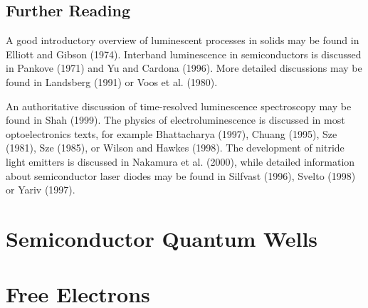 \documentclass[12pt]{book}
\begin{document}
\section*{Further Reading}
A good introductory overview of luminescent processes in solids may be found in Elliott and Gibson (1974). Interband luminescence in semiconductors is discussed in Pankove (1971) and Yu and Cardona (1996). More detailed discussions may be found in Landsberg (1991) or Voos et al. (1980).

An authoritative discussion of time-resolved luminescence spectroscopy may be found in Shah (1999).
The physics of electroluminescence is discussed in most optoelectronics texts, for example Bhattacharya (1997), Chuang (1995), Sze (1981), Sze (1985), or Wilson and Hawkes (1998). The development of nitride light emitters is discussed in Nakamura et al. (2000), while detailed information about semiconductor laser diodes may be found in Silfvast (1996), Svelto (1998) or Yariv (1997).

\chapter{Semiconductor Quantum Wells}\label{chap:6}
\chapter{Free Electrons}\label{chap:7}
\end{document}
